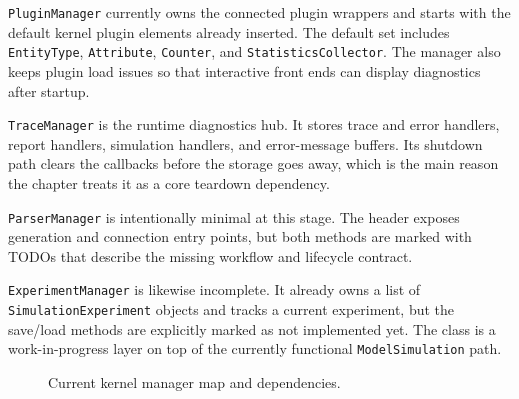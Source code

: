 \texttt{PluginManager} currently owns the connected plugin wrappers and starts
with the default kernel plugin elements already inserted. The default set
includes \texttt{EntityType}, \texttt{Attribute}, \texttt{Counter}, and
\texttt{StatisticsCollector}. The manager also keeps plugin load issues so that
interactive front ends can display diagnostics after startup.

\texttt{TraceManager} is the runtime diagnostics hub. It stores trace and
error handlers, report handlers, simulation handlers, and error-message
buffers. Its shutdown path clears the callbacks before the storage goes away,
which is the main reason the chapter treats it as a core teardown dependency.

\texttt{ParserManager} is intentionally minimal at this stage. The header
exposes generation and connection entry points, but both methods are marked
with TODOs that describe the missing workflow and lifecycle contract.

\texttt{ExperimentManager} is likewise incomplete. It already owns a list of
\texttt{SimulationExperiment} objects and tracks a current experiment, but the
save/load methods are explicitly marked as not implemented yet. The class is a
work-in-progress layer on top of the currently functional
\texttt{ModelSimulation} path.

\begin{figure}[htbp]
\centering
\caption{Current kernel manager map and dependencies.}
\label{fig:kernel-manager-map}
\end{figure}

